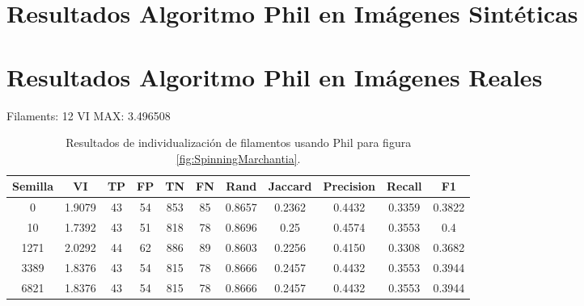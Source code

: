 \label{chap:apendice}

\section{Resultados Algoritmo Phil en Im\'agenes Sint\'eticas}

\section{Resultados Algoritmo Phil en Im\'agenes Reales}

Filaments: 12	VI MAX: 3.496508
\begin{table}[h]
    \centering
    \begin{tabular}{|c|c|c|c|c|c|c|c|c|c|c|}
    \hline
        Semilla & VI & TP & FP &TN &FN & Rand	& Jaccard &	Precision &	Recall &	F1 \\ \hline 
        0    & 1.9079 & 43 & 54 & 853 & 85 & 0.8657 & 0.2362 & 0.4432 & 0.3359 & 0.3822 \\
        10   & 1.7392 & 43 & 51 & 818 & 78 & 0.8696 & 0.25 & 0.4574 & 0.3553 & 0.4 \\
        1271 & 2.0292 & 44 & 62 & 886 & 89 & 0.8603 & 0.2256 & 0.4150 & 0.3308 & 0.3682 \\
        3389 & 1.8376 & 43 & 54 & 815 & 78 & 0.8666 & 0.2457 & 0.4432 & 0.3553 & 0.3944 \\
        6821 & 1.8376 & 43 & 54 & 815 & 78 & 0.8666 & 0.2457 & 0.4432 & 0.3553 & 0.3944 \\
        \hline
    \end{tabular}
    \caption{Resultados de individualizaci\'on de filamentos usando Phil para figura \ref{fig:SpinningMarchantia}.}
    \label{tab:SpinningMarchantiaResults1}
\end{table}

